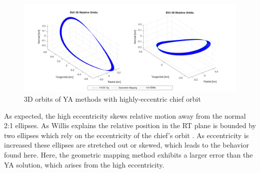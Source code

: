 \begin{figure}[H]
    \centering
    \includegraphics[width=0.7\linewidth]{sim/figures/PS3/3D_YA_comparison_3.png}
    \caption{3D orbits of YA methods with highly-eccentric chief orbit}
    \label{fig:3D_orbits_YA_comp_3}
\end{figure}

As expected, the high eccentricity skews relative motion away from the normal 2:1 ellipses. As Willis explains the relative position in the RT plane is bounded by two ellipses which rely on the eccentricity of the chief's orbit \cite{willis2023analytical}. As eccentricity is increased these ellipses are stretched out or skewed, which leads to the behavior found here. Here, the geometric mapping method exhibits a larger error than the YA solution, which arises from the high eccentricity. 